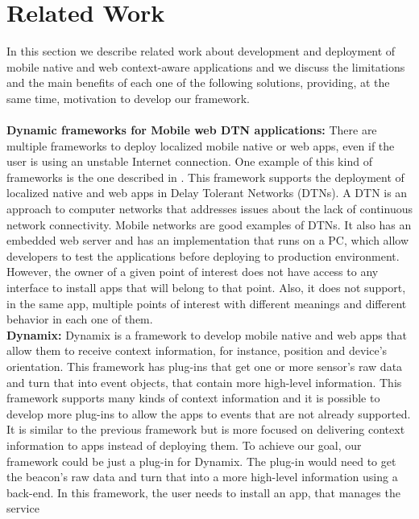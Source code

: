 
%
%

\section{Related Work}
\label{sec:related_work}
In this section we describe related work about
development and deployment of mobile native and web 
context-aware applications and we discuss the 
limitations and the main benefits of each one of
the following solutions, providing, at the same time,
motivation to develop our framework.\\ \\
\textbf{Dynamic frameworks for Mobile web DTN applications:}
There are multiple frameworks to deploy localized
mobile native or web apps, even if the user is using an
unstable Internet connection. One example of this
kind of frameworks is the one
described in \cite{Sankaran2014}.
This framework supports the deployment of localized 
native and
web apps in Delay Tolerant Networks (DTNs).
A DTN is an approach to computer networks that 
addresses issues about the lack of continuous network
connectivity. Mobile networks are good examples of DTNs. 
It also has an embedded web server 
and has an implementation that runs on a PC, which allow
developers to test the applications before deploying
to production environment.
However, the owner of a given point of interest does not
have access to any interface to install apps that will
belong to that point. Also, it does not support, in the
same app, multiple points of interest with different
meanings and different behavior in each one of them. \\
\textbf{Dynamix:}
Dynamix \cite{Carlson2012} is a framework to develop
mobile native and web apps that allow them to receive
context information, for instance, position and device's
orientation. This framework has plug-ins that get
one or more sensor's raw data and turn that into event
objects, that contain more high-level information.
This framework supports many kinds of context information
and it is possible to develop more plug-ins to allow the
apps to events that are not
already supported. It is similar to the previous
framework but is more focused on delivering context
information to apps instead of deploying them.
To achieve our goal, our framework could be just a
plug-in for Dynamix. The plug-in would
need to get the beacon's raw data and
turn that into a more high-level information 
using a back-end. In this framework,
the user needs to install an app, that manages the service

